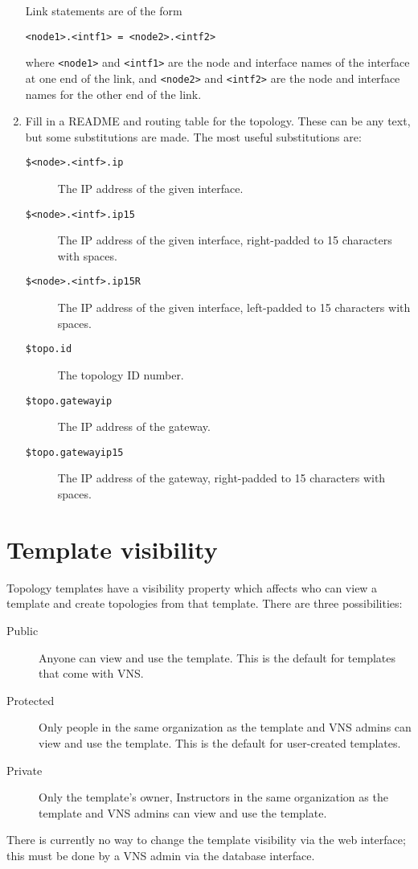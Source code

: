 \documentclass[a4paper,12pt]{report}
\begin{document}
\begin{enumerate}
Link statements are of the form

\texttt{<node1>.<intf1> = <node2>.<intf2>}

where \texttt{<node1>} and \texttt{<intf1>} are the node and interface names of the interface at one end of the link, and \texttt{<node2>} and \texttt{<intf2>} are the node and interface names for the other end of the link.

\item Fill in a README and routing table for the topology.  These can be any text, but some substitutions are made.  The most useful substitutions are:
\begin{description}
\item[\texttt{\$<node>.<intf>.ip}]  The IP address of the given interface.
\item[\texttt{\$<node>.<intf>.ip15}]  The IP address of the given interface, right-padded to 15 characters with spaces.
\item[\texttt{\$<node>.<intf>.ip15R}]  The IP address of the given interface, left-padded to 15 characters with spaces.
\item[\texttt{\$topo.id}]  The topology ID number.
\item[\texttt{\$topo.gatewayip}]  The IP address of the gateway.
\item[\texttt{\$topo.gatewayip15}]  The IP address of the gateway, right-padded to 15 characters with spaces.
\end{description}
\end{enumerate}

\section{Template visibility}
Topology templates have a visibility property which affects who can view a template and create topologies from that template.  There are three possibilities:
\begin{description}
\item[Public]  Anyone can view and use the template.  This is the default for templates that come with VNS.
\item[Protected]  Only people in the same organization as the template and VNS admins can view and use the template.  This is the default for user-created templates.
\item[Private]  Only the template's owner, Instructors in the same organization as the template and VNS admins can view and use the template.
\end{description}
There is currently no way to change the template visibility via the web interface; this must be done by a VNS admin via the database interface.
\end{document}
